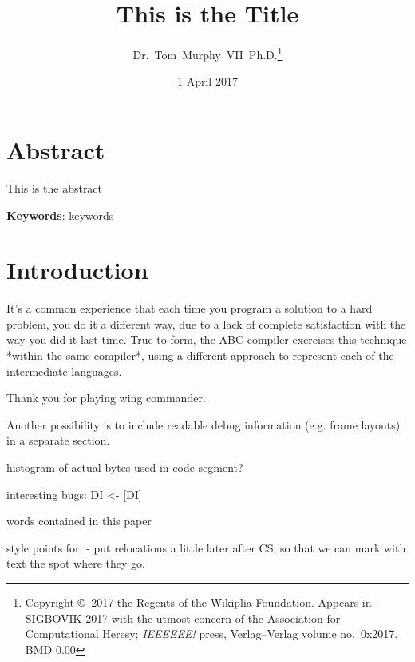 \documentclass[twocolumn]{article}
\begin{document}
 

\title{This is the Title}
\author{Dr.~Tom~Murphy~VII~Ph.D.\thanks{
    Copyright \copyright\ 2017 the Regents of the Wikiplia Foundation.
    Appears in SIGBOVIK 2017 with the utmost concern of the
    Association for Computational Heresy; {\em IEEEEEE!} press,
    Verlag--Verlag volume no.~0x2017. BMD 0.00} }

\renewcommand\>{$>$}
\newcommand\<{$<$}

\date{1 April 2017}

\maketitle

\section*{Abstract}
This is the abstract

\vspace{1em}
{\noindent \small {\bf Keywords}:
  keywords
}

\section{Introduction}





It's a common experience that each time you program a solution to a
hard problem, you do it a different way, due to a lack of complete
satisfaction with the way you did it last time. True to form, the
ABC compiler exercises this technique *within the same compiler*,
using a different approach to represent each of the intermediate
languages.

Thank you for playing wing commander.

Another possibility is to include readable debug information (e.g.
frame layouts) in a separate section.

histogram of actual bytes used in code segment?

interesting bugs:
  DI <- [DI]

words contained in this paper

style points for:
- put relocations a little later after CS, so that we can mark
  with text the spot where they go.
\end{document}
